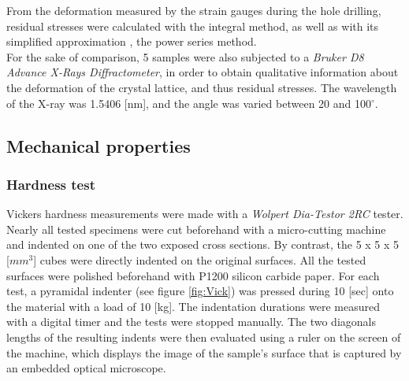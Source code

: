 From the deformation measured by the strain gauges during the hole drilling, residual stresses were calculated with the integral method, as well as with its simplified approximation \cite{Trebuna08}, the power series method.\\

For the sake of comparison, 5 samples were also subjected to a \textit{Bruker D8 Advance X-Rays Diffractometer}, in order to obtain qualitative information about the deformation of the crystal lattice, and thus residual stresses. The wavelength of the X-ray was 1.5406 [nm], and the angle was varied between 20 and 100$^\circ$.\\

\subsection{Mechanical properties}

\subsubsection{Hardness test}


Vickers hardness measurements were made with a \textit{Wolpert Dia-Testor 2RC} tester. Nearly all tested specimens were cut beforehand with a micro-cutting machine and indented on one of the two exposed cross sections. By contrast, the 5 x 5 x 5 [$mm^3$] cubes were directly indented on the original surfaces. All the tested surfaces were polished beforehand with P1200 silicon carbide paper. For each test, a pyramidal indenter (see figure \ref{fig:Vick}) was pressed during 10 [sec] onto the material with a load of 10 [kg]. The indentation durations were measured with a digital timer and the tests were stopped manually. The two diagonals lengths of the resulting indents were then evaluated using a ruler on the screen of the machine, which displays the image of the sample's surface that is captured by an embedded optical microscope.\\

